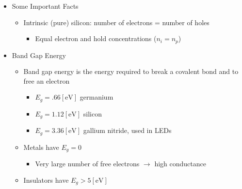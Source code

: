 \begin{itemize}

  \item Some Important Facts

    \begin{itemize}

      \item Intrinsic (pure) silicon: number of electrons = number of holes

        \begin{itemize}

          \item Equal electron and hold concentrations ($n_i=n_p$)

        \end{itemize}

    \end{itemize}

  \item Band Gap Energy

    \begin{itemize}

      \item Band gap energy is the energy required to break a covalent bond and to free an electron

        \begin{itemize}

          \item $E_g=.66[\si{\eV}]$ germanium

          \item $E_g=1.12[\si{\eV}]$ silicon

          \item $E_g=3.36[\si{\eV}]$ gallium nitride, used in LEDs

        \end{itemize}

      \item Metals have $E_g=0$

        \begin{itemize}

          \item Very large number of free electrons $\to$ high conductance

        \end{itemize}

      \item Insulators have $E_g>5[\si{\eV}]$

        \begin{itemize}


\end{itemize}
\end{itemize}
\end{itemize}
